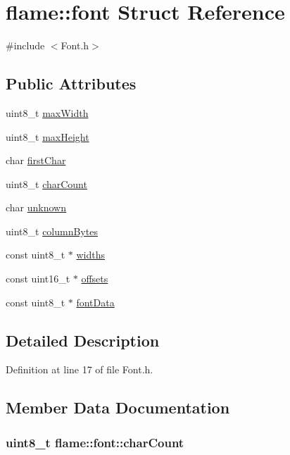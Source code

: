 \hypertarget{structflame_1_1font}{\section{flame\-:\-:font Struct Reference}
\label{structflame_1_1font}
}


{\ttfamily \#include $<$Font.\-h$>$}

\subsection*{Public Attributes}
\begin{DoxyCompactItemize}
\item 
uint8\-\_\-t \hyperlink{structflame_1_1font_aea35e5714307ab12864914066afdf240}{max\-Width}
\item 
uint8\-\_\-t \hyperlink{structflame_1_1font_a620b35f9b267bfd1dc0a7cddeef572f3}{max\-Height}
\item 
char \hyperlink{structflame_1_1font_acea33287f36392ee1c9c60af621ddc16}{first\-Char}
\item 
uint8\-\_\-t \hyperlink{structflame_1_1font_a0759c623176f3bb21d15f186f2dbc79d}{char\-Count}
\item 
char \hyperlink{structflame_1_1font_a4ea62d516f3a369f13274524b77cc00c}{unknown}
\item 
uint8\-\_\-t \hyperlink{structflame_1_1font_aeeec32787794f849a9e0a73a0a9780c5}{column\-Bytes}
\item 
const uint8\-\_\-t $\ast$ \hyperlink{structflame_1_1font_ab7d5ef1be33ef6dd3c2e91da39d31245}{widths}
\item 
const uint16\-\_\-t $\ast$ \hyperlink{structflame_1_1font_a6038d663e6abc38afb5af78c841a97c9}{offsets}
\item 
const uint8\-\_\-t $\ast$ \hyperlink{structflame_1_1font_a9128d2a44b97261abf7b3e58812e29c8}{font\-Data}
\end{DoxyCompactItemize}


\subsection{Detailed Description}


Definition at line 17 of file Font.\-h.



\subsection{Member Data Documentation}
\hypertarget{structflame_1_1font_a0759c623176f3bb21d15f186f2dbc79d}{
\subsubsection[{char\-Count}]{\setlength{\rightskip}{0pt plus 5cm}uint8\-\_\-t flame\-::font\-::char\-Count}}\label{structflame_1_1font_a0759c623176f3bb21d15f186f2dbc79d}


